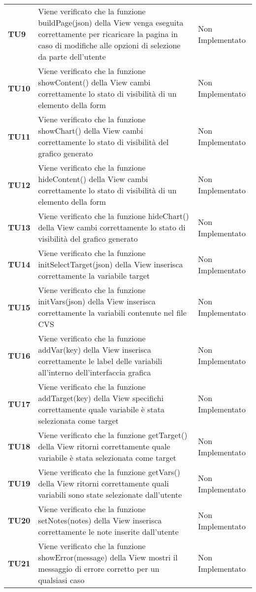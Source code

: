 \documentclass[../piano-di-qualifica.tex]{subfiles}
\begin{document}
\begin{longtable}[H]{>{\centering\bfseries}m{2.5cm} >{\centering}m{7.5cm} >{\centering\arraybackslash}m{3.5cm}}
  \textbf{TU9} & Viene verificato che la funzione buildPage(json) della View venga eseguita correttamente per ricaricare la pagina in caso di modifiche alle opzioni di selezione da parte dell'utente & Non Implementato \\
  \textbf{TU10} & Viene verificato che la funzione showContent() della View cambi correttamente lo stato di visibilità di un elemento della form & Non Implementato \\
  \textbf{TU11} & Viene verificato che la funzione showChart() della View cambi correttamente lo stato di visibilità del grafico generato & Non Implementato \\
  \textbf{TU12} & Viene verificato che la funzione hideContent() della View cambi correttamente lo stato di visibilità di un elemento della form & Non Implementato \\
  \textbf{TU13} & Viene verificato che la funzione hideChart() della View cambi correttamente lo stato di visibilità del grafico generato & Non Implementato \\
  \textbf{TU14} & Viene verificato che la funzione initSelectTarget(json) della View inserisca correttamente la variabile target & Non Implementato \\
  \textbf{TU15} & Viene verificato che la funzione initVars(json) della View inserisca correttamente la variabili contenute nel file CVS & Non Implementato \\
  \textbf{TU16} & Viene verificato che la funzione addVar(key) della View inserisca correttamente le label delle variabili all'interno dell'interfaccia grafica & Non Implementato \\
  \textbf{TU17} & Viene verificato che la funzione addTarget(key) della View specifichi correttamente quale variabile è stata selezionata come target & Non Implementato \\
  \textbf{TU18} & Viene verificato che la funzione getTarget() della View ritorni correttamente quale variabile è stata selezionata come target & Non Implementato \\
  \textbf{TU19} & Viene verificato che la funzione getVars() della View ritorni correttamente quali variabili sono state selezionate dall'utente & Non Implementato \\
  \textbf{TU20} & Viene verificato che la funzione setNotes(notes) della View inserisca correttamente le note inserite dall'utente & Non Implementato \\
  \textbf{TU21} & Viene verificato che la funzione showError(message) della View mostri il messaggio di errore corretto per un qualsiasi caso & Non Implementato \\

\end{longtable}
\end{document}
